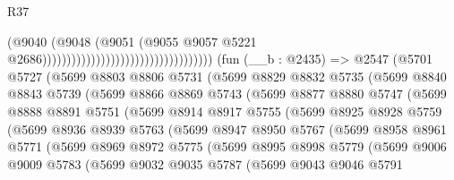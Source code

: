 \begin{lexlean}{R37}
\begin{coremodule}
                                                                  (@9040
                                                                    (@9048
                                                                      (@9051
                                                                        (@9055
                                                                          @9057
                                                                          @5221
                                                                          @2686)))))))))))))))))))))))))))))))))))
    (fun (__b : @2435) =>
    @2547
      (@5701
        @5727
        (@5699
          @8803
          @8806
          @5731
          (@5699
            @8829
            @8832
            @5735
            (@5699
              @8840
              @8843
              @5739
              (@5699
                @8866
                @8869
                @5743
                (@5699
                  @8877
                  @8880
                  @5747
                  (@5699
                    @8888
                    @8891
                    @5751
                    (@5699
                      @8914
                      @8917
                      @5755
                      (@5699
                        @8925
                        @8928
                        @5759
                        (@5699
                          @8936
                          @8939
                          @5763
                          (@5699
                            @8947
                            @8950
                            @5767
                            (@5699
                              @8958
                              @8961
                              @5771
                              (@5699
                                @8969
                                @8972
                                @5775
                                (@5699
                                  @8995
                                  @8998
                                  @5779
                                  (@5699
                                    @9006
                                    @9009
                                    @5783
                                    (@5699
                                      @9032
                                      @9035
                                      @5787
                                      (@5699
                                        @9043
                                        @9046
                                        @5791

\end{coremodule}
\end{lexlean}
